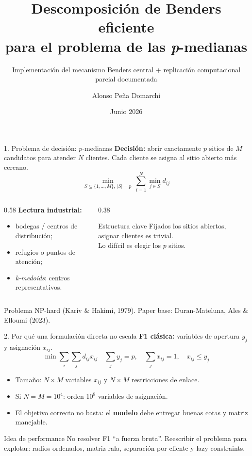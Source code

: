 \documentclass[10pt,aspectratio=169]{beamer}
\title[Benders para p-medianas]{Descomposición de Benders eficiente\\para el problema de las \textit{p}-medianas}
\subtitle{Implementación del mecanismo Benders central + replicación computacional parcial documentada}
\author{Alonso Peña Domarchi}
\institute[PUCV]{Optimización Computacional — PUCV}
\date{Junio 2026}
\begin{document}
\begin{frame}\titlepage\end{frame}

\begin{frame}{1. Problema de decisión: $p$-medianas}
\textbf{Decisión:} abrir exactamente $p$ sitios de $M$ candidatos para atender $N$ clientes.
Cada cliente se asigna al sitio abierto más cercano.
\[
  \min_{S\subseteq\{1,\dots,M\},\ |S|=p}\ \sum_{i=1}^{N}\min_{j\in S} d_{ij}
\]
\begin{columns}
\begin{column}{0.58\textwidth}
\textbf{Lectura industrial:}
\begin{itemize}
  \item bodegas / centros de distribución;
  \item refugios o puntos de atención;
  \item \textit{k-medoids}: centros representativos.
\end{itemize}
\end{column}
\begin{column}{0.38\textwidth}
\begin{block}{Estructura clave}
Fijados los sitios abiertos, asignar clientes es trivial.\\[3pt]
Lo difícil es elegir los $p$ sitios.
\end{block}
\end{column}
\end{columns}
\vfill
\footnotesize Problema NP-hard (Kariv \& Hakimi, 1979). Paper base: Duran-Mateluna, Ales \& Elloumi (2023).
\end{frame}

\begin{frame}{2. Por qué una formulación directa no escala}
\textbf{F1 clásica:} variables de apertura $y_j$ y asignación $x_{ij}$.
\[
\min \sum_i\sum_j d_{ij}x_{ij}\quad
\sum_j y_j=p,\quad \sum_j x_{ij}=1,\quad x_{ij}\le y_j
\]
\begin{itemize}
  \item Tamaño: $N\times M$ variables $x_{ij}$ y $N\times M$ restricciones de enlace.
  \item Si $N=M=10^4$: orden $10^8$ variables de asignación.
  \item El objetivo correcto no basta: el \textbf{modelo} debe entregar buenas cotas y matriz manejable.
\end{itemize}
\begin{block}{Idea de performance}
No resolver F1 “a fuerza bruta”. Reescribir el problema para explotar: radios ordenados, matriz rala, separación por cliente y lazy constraints.
\end{block}
\end{frame}
\end{document}
